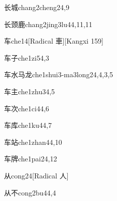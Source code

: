 \begin{verbete}{长城}{chang2cheng2}{4,9}
\end{verbete}

\begin{verbete}{长颈鹿}{chang2jing3lu4}{4,11,11}
\end{verbete}

\begin{verbete}{车}{che1}{4}[Radical 車][Kangxi 159]
\end{verbete}

\begin{verbete}{车子}{che1zi5}{4,3}
\end{verbete}

\begin{verbete}{车水马龙}{che1shui3-ma3long2}{4,4,3,5}
\end{verbete}

\begin{verbete}{车主}{che1zhu3}{4,5}
\end{verbete}

\begin{verbete}{车次}{che1ci4}{4,6}
\end{verbete}

\begin{verbete}{车库}{che1ku4}{4,7}
\end{verbete}

\begin{verbete}{车站}{che1zhan4}{4,10}
\end{verbete}

\begin{verbete}{车牌}{che1pai2}{4,12}
\end{verbete}

\begin{verbete}{从}{cong2}{4}[Radical ⼈]
\end{verbete}

\begin{verbete}{从不}{cong2bu4}{4,4}
\end{verbete}

